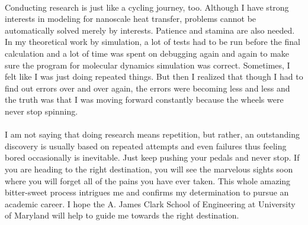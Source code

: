 \documentclass[a4paper,10pt]{article}
\begin{document}
\begin{spacing}{1.5}
\\
Conducting research is just like a cycling journey, too. Although I have strong interests in modeling for nanoscale heat transfer, problems cannot be automatically solved merely by interests. Patience and stamina are also needed. In my theoretical work by simulation, a lot of tests had to be run before the final calculation and a lot of time was spent on debugging again and again to make sure the program for molecular dynamics simulation was correct. Sometimes, I felt like I was just doing repeated things. But then I realized that though I had to find out errors over and over again, the errors were becoming less and less and the truth was that I was moving forward constantly because the wheels were never stop spinning. \\
\\
I am not saying that doing research means repetition, but rather, an outstanding discovery is usually based on repeated attempts and even failures thus feeling bored occasionally is inevitable. Just keep pushing your pedals and never stop. If you are heading to the right destination, you will see the marvelous sights soon where you will forget all of the pains you have ever taken. This whole amazing bitter-sweet process intrigues me and confirms my determination to pursue an academic career. I hope the A. James Clark School of Engineering at University of Maryland will help to guide me towards the right destination.
\end{spacing}
\end{document}
